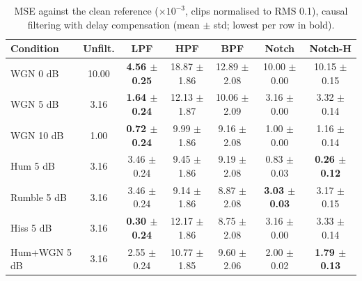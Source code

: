 \begin{table}[!t]
\caption{MSE against the clean reference ($\times10^{-3}$, clips normalised to RMS 0.1), causal filtering with delay compensation (mean $\pm$ std; lowest per row in bold).}
\label{tab:mse_causal}
\centering\footnotesize
\begin{tabular}{lcccccc}
\hline
Condition & Unfilt. & LPF & HPF & BPF & Notch & Notch-H \\ \hline
WGN 0 dB & 10.00 & \textbf{4.56 $\pm$ 0.25} & 18.87 $\pm$ 1.86 & 12.89 $\pm$ 2.08 & 10.00 $\pm$ 0.00 & 10.15 $\pm$ 0.15 \\
WGN 5 dB & 3.16 & \textbf{1.64 $\pm$ 0.24} & 12.13 $\pm$ 1.87 & 10.06 $\pm$ 2.09 & 3.16 $\pm$ 0.00 & 3.32 $\pm$ 0.14 \\
WGN 10 dB & 1.00 & \textbf{0.72 $\pm$ 0.24} & 9.99 $\pm$ 1.86 & 9.16 $\pm$ 2.08 & 1.00 $\pm$ 0.00 & 1.16 $\pm$ 0.14 \\
Hum 5 dB & 3.16 & 3.46 $\pm$ 0.24 & 9.45 $\pm$ 1.86 & 9.19 $\pm$ 2.08 & 0.83 $\pm$ 0.03 & \textbf{0.26 $\pm$ 0.12} \\
Rumble 5 dB & 3.16 & 3.46 $\pm$ 0.24 & 9.14 $\pm$ 1.86 & 8.87 $\pm$ 2.08 & \textbf{3.03 $\pm$ 0.03} & 3.17 $\pm$ 0.15 \\
Hiss 5 dB & 3.16 & \textbf{0.30 $\pm$ 0.24} & 12.17 $\pm$ 1.86 & 8.75 $\pm$ 2.08 & 3.16 $\pm$ 0.00 & 3.33 $\pm$ 0.14 \\
Hum+WGN 5 dB & 3.16 & 2.55 $\pm$ 0.24 & 10.77 $\pm$ 1.85 & 9.60 $\pm$ 2.06 & 2.00 $\pm$ 0.02 & \textbf{1.79 $\pm$ 0.13} \\
\hline
\end{tabular}

\end{table}